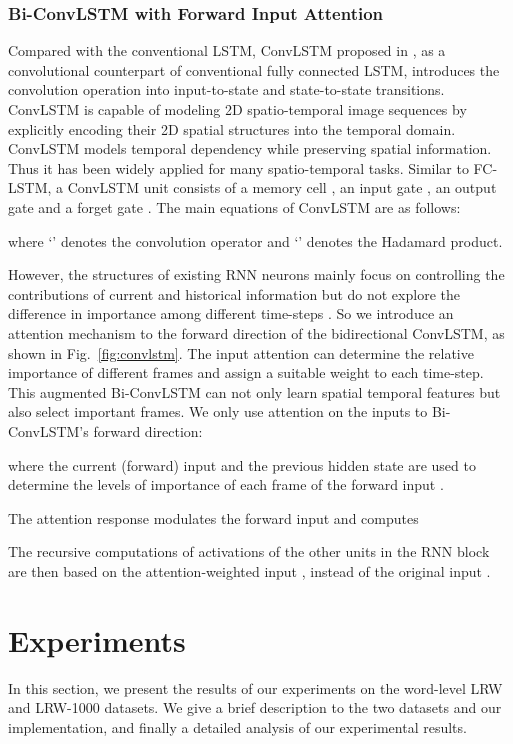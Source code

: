 \documentclass{bmvc2k}
\begin{document}
\subsubsection{Bi-ConvLSTM with Forward Input Attention}
\label{sec:attconvlstm}
Compared with the conventional LSTM, ConvLSTM proposed in \cite{Shi2015Convolutional}, as a convolutional counterpart of conventional fully connected LSTM, introduces the convolution operation into input-to-state and state-to-state transitions. ConvLSTM is capable of modeling 2D spatio-temporal image sequences by explicitly encoding their 2D spatial structures into the temporal domain. ConvLSTM models temporal dependency while preserving spatial information. Thus it has been widely applied for many spatio-temporal  tasks. Similar to FC-LSTM, a ConvLSTM unit consists of a memory cell  , an input gate  , an output gate   and a forget gate  . The main equations of ConvLSTM are as follows:

where `' denotes the convolution operator and `' denotes the Hadamard product. 

However, the structures of existing RNN neurons mainly focus on controlling the contributions of current and historical information but do not explore the difference in importance among different time-steps \cite{1zhang2018adding}. So we introduce an attention mechanism to the forward direction of the bidirectional ConvLSTM, as shown in Fig.~\ref{fig:convlstm}. The input attention can determine the relative importance of different frames and assign a suitable weight to each time-step. This augmented Bi-ConvLSTM can not only learn spatial temporal features but also select important frames. We only use attention on the inputs to Bi-ConvLSTM's forward direction:

where the current (forward) input  and the previous hidden state  are used to determine the levels of importance of each frame of the forward input   .

The attention response modulates the forward input and computes

The recursive computations of activations of the other units in the RNN block are then based on the attention-weighted input , instead of the original input .


\section{Experiments}
In this section, we present the results of our experiments on the word-level LRW and LRW-1000 datasets. We give a brief description to the two datasets and our implementation, and finally a detailed analysis of our experimental results.
\vspace{-1em}
\end{document}
